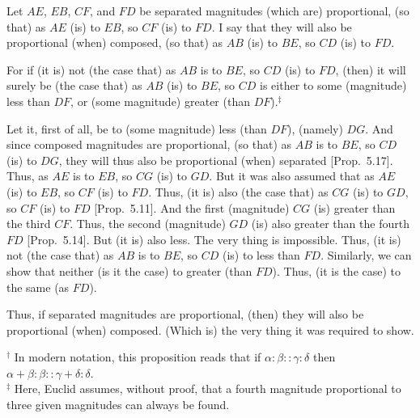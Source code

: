 \begin{Parallel}{}{}
{Let $AE$, $EB$, $CF$, and $FD$ be separated magnitudes (which are) proportional,
(so that) as $AE$ (is) to $EB$, so  $CF$ (is) to $FD$. I say that they will also be proportional (when)  composed, (so that) as $AB$ (is) to $BE$, so  $CD$ (is) to $FD$.

For if (it is) not (the case that) as $AB$ is to $BE$, so $CD$ (is) to $FD$, (then) it will
surely be (the case that) as $AB$ (is) to $BE$, so
 $CD$ is either to some (magnitude) less than $DF$, or (some magnitude) greater (than $DF$).$^\ddag$
 
 Let it, first of all, be to (some magnitude) less (than $DF$), (namely) $DG$. And since composed magnitudes are proportional, (so that) as $AB$ is
 to $BE$, so $CD$ (is) to $DG$,  they will  thus also be proportional (when) separated 
 [Prop.~5.17]. Thus, as $AE$ is to $EB$, so
 $CG$ (is) to $GD$. But it was also assumed that as $AE$ (is) to $EB$, so $CF$ (is)
 to $FD$. Thus, (it is) also (the case that) as $CG$ (is) to $GD$, so $CF$ (is) to $FD$ [Prop.~5.11]. And the first (magnitude) $CG$ (is)
 greater than the third $CF$. Thus, the second (magnitude) $GD$ (is)
 also greater than the fourth $FD$ [Prop.~5.14]. 
 But (it is) also less. The very thing is impossible. Thus, (it is) not (the case that) as $AB$ is to $BE$, so $CD$ (is) to less than $FD$. Similarly, we can show
 that neither (is it the case) to greater (than $FD$). Thus, (it is the case) to
 the same (as $FD$).
 
 Thus, if separated  magnitudes are proportional,  (then) they will also be 
 proportional (when)
composed. (Which is) the very thing it was required to show.}
\end{Parallel}
{\footnotesize \noindent$^\dag$ In modern notation, this proposition
reads that if $\alpha:\beta::\gamma:\delta$ then $\alpha+\beta:\beta::
\gamma+\delta:\delta$.}\\
{\footnotesize \noindent$^\ddag$ Here, Euclid assumes, without proof, that
a fourth magnitude proportional to three given magnitudes can always
be found.}

